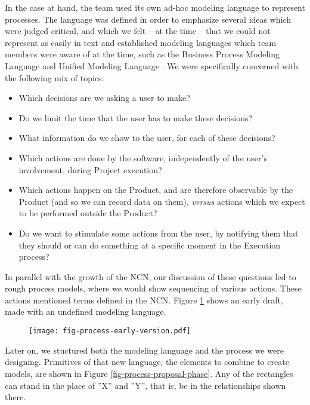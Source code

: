 \documentclass[graybox,envcountchap,sectrefs]{svmono}
\newcommand{\ncn}{NCN}
\newcommand{\nterm}[1]{\textsf{#1}}
\begin{document}
In the case at hand, the team used its own ad-hoc modeling language to represent processes. The language was defined in order to emphasize several ideas which were judged critical, and which we felt -- at the time -- that we could not represent as easily in text and established modeling languages which team members were aware of at the time, such as the Business Process Modeling Language \cite{} and Unified Modeling Language \cite{}. We were specifically concerned with the following mix of topics:
\begin{itemize}
	\item Which decisions are we asking a user to make?
	\item Do we limit the time that the user has to make these decisions?
	\item What information do we show to the user, for each of these decisions? 
 	\item  Which actions are done by the software, independently of the user's involvement, during \nterm{Project execution}? 
 	\item Which actions happen on the \nterm{Product}, and are therefore observable by the \nterm{Product} (and so we can record data on them), \textit{versus} actions which we expect to be performed outside the \nterm{Product}?
 	\item Do we want to stimulate some actions from the user, by notifying them that they should or can do something at a specific moment in the \nterm{Execution process}?
\end{itemize}

In parallel with the growth of the \ncn, our discussion of these questions led to rough process models, where we would show sequencing of various actions. These actions mentioned terms defined in the \ncn. Figure \ref{fig-process-early-version} shows an early draft, made with an undefined modeling language. 

\begin{figure}[h]
	\centering
	\texttt{[image: fig-process-early-version.pdf]}
	\caption{}
	\label{fig-process-early-version}
\end{figure}

Later on, we stuctured both the modeling language and the process we were designing. Primitives of that new language, the elements to combine to create models, are shown in Figure \ref{fig-process-proposal-phase}. Any of the rectangles can stand in the place of ''X'' and ''Y'', that is, be in the relationships shown there. 
\end{document}
